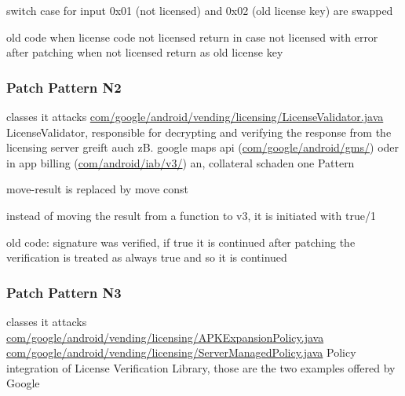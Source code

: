 switch case for input 0x01 (not licensed) and 0x02 (old license key) are swapped


old code when license code not licensed return in case not licensed with error
after patching when not licensed return as old license key
\subsubsection{Patch Pattern N2}
classes it attacks %
\url{com/google/android/vending/licensing/LicenseValidator.java}
LicenseValidator, responsible for decrypting and verifying the response from the licensing server\cite{developersLicensingReference}
greift auch zB. google maps api (\url{com/google/android/gms/}) oder in app billing (\url{com/android/iab/v3/}) an, collateral schaden
one Pattern



move-result is replaced by move const



instead of moving the result from a function to v3, it is initiated with true/1



old code: signature was verified, if true it is continued
after patching the verification is treated as always true and so it is continued
\subsubsection{Patch Pattern N3}
classes it attacks %
\url{com/google/android/vending/licensing/APKExpansionPolicy.java}
\url{com/google/android/vending/licensing/ServerManagedPolicy.java}
Policy integration of License Verification Library, those are the two examples offered by Google\cite{developersLicensingReference}

